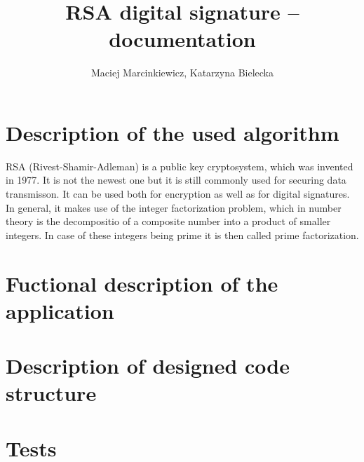 \documentclass{article}
\title{ RSA digital signature -- documentation}
\author{Maciej Marcinkiewicz, Katarzyna Bielecka}
\begin{document}
\maketitle

\newpage
\section{Description of the used algorithm}
RSA (Rivest-Shamir-Adleman) is a public key cryptosystem, which was invented in 1977. It is not the newest one but it is still commonly used for securing data transmisson.
It can be used both for encryption as well as for digital signatures. In general, it makes use of the integer factorization problem, which in number theory is the decompositio of a composite number into a product of smaller integers. In case of these integers being prime it is then called prime factorization.  
\section{Fuctional description of the application}
\newpage
\section{Description of designed code structure}
% 
\section{Tests}
\end{document}
